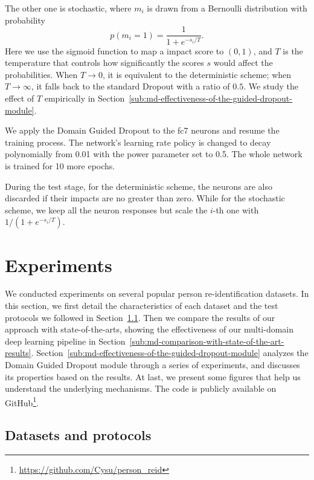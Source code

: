 The other one is stochastic, where $m_i$ is drawn from a Bernoulli distribution with probability
\begin{equation} \label{eq:md-stochastic-guided-dropout}
   p(m_i=1) = \frac{1}{1+e^{-s_i/T}}.
\end{equation}
Here we use the sigmoid function to map a impact score to $(0,1)$, and $T$ is the temperature that controls how significantly the scores $s$ would affect the probabilities. When $T\to 0$, it is equivalent to the deterministic scheme; when $T\to \infty$, it falls back to the standard Dropout with a ratio of $0.5$. We study the effect of $T$ empirically in Section~\ref{sub:md-effectiveness-of-the-guided-dropout-module}.

We apply the Domain Guided Dropout to the fc7 neurons and resume the training process. The network's learning rate policy is changed to decay polynomially from 0.01 with the power parameter set to 0.5. The whole network is trained for 10 more epochs.

During the test stage, for the deterministic scheme, the neurons are also discarded if their impacts are no greater than zero. While for the stochastic scheme, we keep all the neuron responses but scale the $i$-th one with $1/(1+e^{-s_i/T})$.




\section{Experiments} %
\label{sec:md-experiments}

We conducted experiments on several popular person re-identification datasets. In this section, we first detail the characteristics of each dataset and the test protocols we followed in Section~\ref{sub:md-datasets-and-protocols}. Then we compare the results of our approach with state-of-the-arts, showing the effectiveness of our multi-domain deep learning pipeline in Section~\ref{sub:md-comparison-with-state-of-the-art-results}. Section~\ref{sub:md-effectiveness-of-the-guided-dropout-module} analyzes the Domain Guided Dropout module through a series of experiments, and discusses its properties based on the results. At last, we present some figures that help us understand the underlying mechanisms. The code is publicly available on GitHub\footnote{\url{https://github.com/Cysu/person_reid}}.

\subsection{Datasets and protocols} %
\label{sub:md-datasets-and-protocols}

